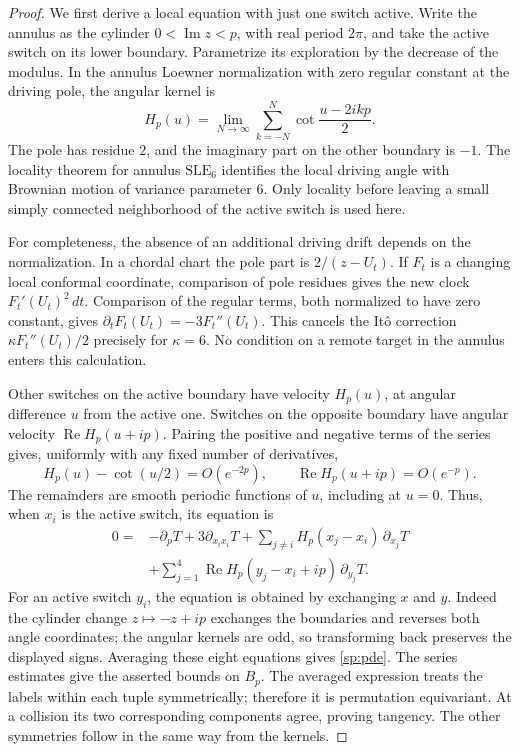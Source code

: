 \begin{proof}
We first derive a local equation with just one switch active.  Write the
annulus as the cylinder $0<\operatorname{Im}z<p$, with real period
$2\pi$, and take the active switch on its lower boundary.  Parametrize
its exploration by the decrease of the modulus.  In the annulus Loewner
normalization with zero regular constant at the driving pole, the
angular kernel is
\[
 H_p(u)=\lim_{N\to\infty}\sum_{k=-N}^N
                     \cot\frac{u-2ikp}{2}.
\]
The pole has residue $2$, and the imaginary part on the other boundary
is $-1$.  The locality theorem for annulus $\mathrm{SLE}_6$
\cite{Zhan} identifies the local driving angle with Brownian motion
of variance parameter $6$.  Only locality before leaving a small
simply connected neighborhood of the active switch is used here.

For completeness, the absence of an additional driving drift depends
on the normalization.  In a chordal chart the pole part is
$2/(z-U_t)$.  If $F_t$ is a changing local conformal coordinate, comparison
of pole residues gives the new clock $F_t'(U_t)^2\,dt$.  Comparison of
the regular terms, both normalized to have zero constant, gives
$\partial_tF_t(U_t)=-3F_t''(U_t)$.  This cancels the It\^o correction
$\kappa F_t''(U_t)/2$ precisely for $\kappa=6$.
No condition on a remote target in the annulus enters this calculation.

Other switches on the active boundary have velocity $H_p(u)$, at
angular difference $u$ from the active one.  Switches on the opposite
boundary have angular velocity $\operatorname{Re}H_p(u+ip)$.
Pairing the positive and negative terms of the series gives, uniformly
with any fixed number of derivatives,
\begin{equation}\label{sp:kernel-errors}
 H_p(u)-\cot(u/2)=O(e^{-2p}),
 \qquad \operatorname{Re}H_p(u+ip)=O(e^{-p}).
\end{equation}
The remainders are smooth periodic functions of $u$, including at
$u=0$.  Thus, when $x_i$ is the active switch, its equation is
\begin{equation}\label{sp:active-equation}
 \begin{aligned}
 0={}&-\partial_pT+3\partial_{x_ix_i}T
       +\sum_{j\ne i}H_p(x_j-x_i)\,\partial_{x_j}T\\
    &+\sum_{j=1}^4\operatorname{Re}H_p(y_j-x_i+ip)\,
                                      \partial_{y_j}T.
 \end{aligned}
\end{equation}
For an active switch $y_i$, the equation is obtained by exchanging
$x$ and $y$.  Indeed the cylinder change $z\mapsto-z+ip$ exchanges
the boundaries and reverses both angle coordinates; the angular
kernels are odd, so transforming back preserves the displayed signs.
Averaging these eight equations gives \eqref{sp:pde}.
The series estimates give the asserted bounds on $B_p$.  The averaged
expression treats the labels within each tuple symmetrically; therefore
it is permutation equivariant.  At a collision its two corresponding
components agree, proving tangency.  The other symmetries follow in
the same way from the kernels.


\end{proof}
